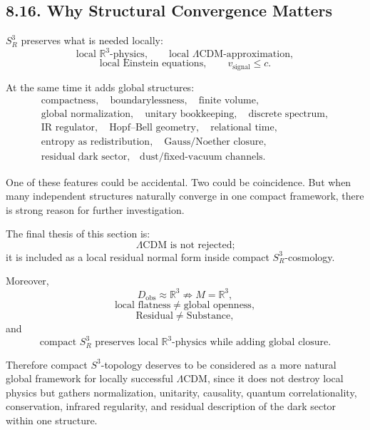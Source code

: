 \documentclass[12pt,a4paper]{article}
\theoremstyle{definition}
\begin{document}
\subsection*{8.16. Why Structural Convergence Matters}

\(S^3_R\) preserves what is needed locally:
\[
\text{local }\mathbb{R}^3\text{-physics},
\qquad
\text{local }\Lambda\mathrm{CDM}\text{-approximation},
\]
\[
\text{local Einstein equations},
\qquad
v_{\mathrm{signal}}\leq c.
\]

At the same time it adds global structures:
\begin{gather*}
\text{compactness},\quad
\text{boundarylessness},\quad
\text{finite volume},\\
\text{global normalization},\quad
\text{unitary bookkeeping},\quad
\text{discrete spectrum},\\
\text{IR regulator},\quad
\text{Hopf--Bell geometry},\quad
\text{relational time},\\
\text{entropy as redistribution},\quad
\text{Gauss/Noether closure},\\
\text{residual dark sector},\quad
\text{dust/fixed-vacuum channels.}
\end{gather*}

One of these features could be accidental. Two could be coincidence. But when many independent structures naturally converge in one compact framework, there is strong reason for further investigation.

The final thesis of this section is:
\[
\Lambda\mathrm{CDM}
\text{ is not rejected;}
\]
it is included as a local residual normal form inside compact \(S^3_R\)-cosmology.

Moreover,
\[
D_{\mathrm{obs}}\approx \mathbb R^3
\not\Rightarrow
M=\mathbb R^3,
\]
\[
\text{local flatness}\neq \text{global openness},
\]
\[
\mathrm{Residual}\neq \mathrm{Substance},
\]
and
\[
\text{compact }S^3_R\text{ preserves local }\mathbb{R}^3\text{-physics}
\text{ while adding global closure.}
\]

Therefore compact \(S^3\)-topology deserves to be considered as a more natural global framework for locally successful \(\Lambda\)CDM, since it does not destroy local physics but gathers normalization, unitarity, causality, quantum correlationality, conservation, infrared regularity, and residual description of the dark sector within one structure.

\clearpage
\end{document}
